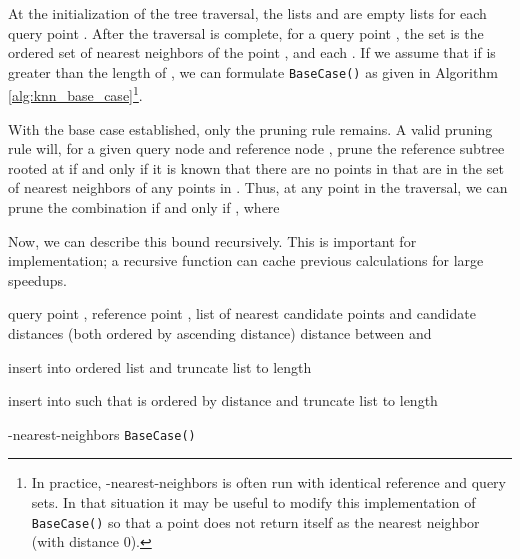 \documentclass{article}
\begin{document}
At the initialization of the tree traversal, the lists  and 
are empty lists for each query point .  After the traversal is complete,
for a query point , the set  is the
ordered set of  nearest neighbors of the point , and each .  If we assume that  if  is
greater than the length of , we can formulate \texttt{BaseCase()} as
given in Algorithm \ref{alg:knn_base_case}\footnote{
In practice, -nearest-neighbors is often run with identical reference and
query sets.  In that situation it may be useful to modify this implementation of
\texttt{BaseCase()} so that a point does not return itself as the nearest
neighbor (with distance 0).}.

With the base case established, only the pruning rule remains.  A valid pruning
rule will, for a given query node  and reference node
, prune the reference subtree rooted at  if
and only if it is known that there are no points in  that are
in the set of  nearest neighbors of any points in .
Thus, at any point in the traversal, we can prune the combination
 if and only if , where

\vspace*{-2em}

\vspace*{-2em}

Now, we can describe this bound recursively.  This is important for
implementation; a recursive function can cache previous calculations for large
speedups.

\vspace*{-1em}

\vspace*{-2em}

\begin{algorithm}[tb]
\begin{algorithmic}
     query point , reference point , list of
 nearest candidate points  and  candidate distances 
(both ordered by ascending distance)
     distance  between  and 

    \medskip
    \STATE 
    \medskip

    \STATE  insert  into ordered list  and truncate list to length

    \STATE  insert  into  such that  is ordered by
distance and truncate list to length 
    \ENDIF

    \RETURN 
  \end{algorithmic}

  \caption{-nearest-neighbors \texttt{BaseCase()}}
  \label{alg:knn_base_case}
\end{algorithm}
\end{document}
